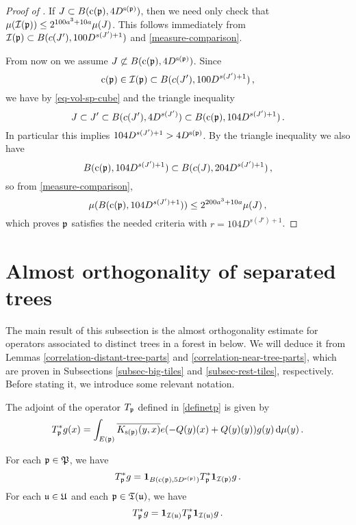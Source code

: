 \begin{proof}[Proof of ]
    If $J \subset B({\mathrm{c}}({\mathfrak p}), 4 D^{{\mathrm{s}}({\mathfrak p})})$, then we need only check that
    $\mu({\mathcal{I}}({\mathfrak p})) \le 2^{100a^3 + 10a} \mu(J)$. This follows immediately from
    ${\mathcal{I}}({\mathfrak p}) \subset B(c(J'), 100 D^{s(J') + 1})$ and \eqref{measure-comparison}.

    From now on we assume $J \not \subset B({\mathrm{c}}({\mathfrak p}), 4 D^{{\mathrm{s}}({\mathfrak p})})$. Since
    \begin{equation*}
        {\mathrm{c}}({\mathfrak p}) \in {\mathcal{I}}({\mathfrak p}) \subset B(c(J'), 100 D^{s(J') + 1})\, ,
    \end{equation*}
    we have by \eqref{eq-vol-sp-cube} and the triangle inequality
    $$
        J \subset J' \subset B(c(J'), 4D^{s(J')}) \subset B({\mathrm{c}}({\mathfrak p}), 104 D^{s(J') + 1})\,.
    $$
    In particular this implies $104 D^{s(J') + 1} > 4D^{{\mathrm{s}}({\mathfrak p})}$. By the triangle inequality
    we also have
    $$
        B({\mathrm{c}}({\mathfrak p}), 104 D^{s(J') + 1}) \subset B(c(J), 204 D^{s(J') + 1})\,,
    $$
    so from \eqref{measure-comparison},
    $$
        \mu( B({\mathrm{c}}({\mathfrak p}), 104 D^{s(J') + 1})) \le 2^{200a^3 + 10a} \mu(J)\,,
    $$
    which proves ${\mathfrak p}$ satisfies the needed criteria with $r=104 D^{s(J') + 1}$.

\end{proof}

\section{Almost orthogonality of separated trees}

The main result of this subsection is the almost orthogonality estimate for operators associated to distinct trees in a forest in  below. We will deduce it from Lemmas \ref{correlation-distant-tree-parts} and \ref{correlation-near-tree-parts}, which are proven in Subsections \ref{subsec-big-tiles} and \ref{subsec-rest-tiles}, respectively. Before stating it, we introduce some relevant notation.

The adjoint of the operator $T_{{\mathfrak p}}$ defined in \eqref{definetp} is given by
\begin{equation}
    \label{definetp*}
    T_{{\mathfrak p}}^* g(x) = \int_{E({\mathfrak p})} \overline{K_{{\mathrm{s}}({\mathfrak p})}(y,x)} e(-{Q}(y)(x)+ {Q}(y)(y)) g(y) \, \mathrm{d}\mu(y)\,.
\end{equation}

\begin{lemma}
    \label{adjoint-tile-support}
    \leanok
    For each ${\mathfrak p} \in {\mathfrak P}$, we have
    $$
        T_{{\mathfrak p}}^* g = \mathbf{1}_{B({\mathrm{c}}({\mathfrak p}), 5D^{{\mathrm{s}}({\mathfrak p})})} T_{{\mathfrak p}}^* \mathbf{1}_{{\mathcal{I}}({\mathfrak p})} g\,.
    $$
    For each ${\mathfrak u} \in {\mathfrak U}$ and each ${\mathfrak p} \in {\mathfrak T}({\mathfrak u})$, we have
    $$
        T_{{\mathfrak p}}^* g = \mathbf{1}_{{\mathcal{I}}({\mathfrak u})} T_{{\mathfrak p}}^* \mathbf{1}_{{\mathcal{I}}({\mathfrak u})} g\,.
    $$
\end{lemma}

